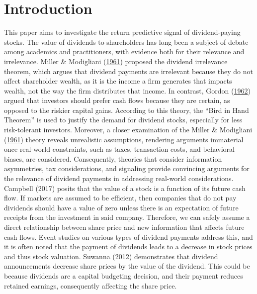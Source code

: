 \documentclass[11pt,preprint, authoryear]{elsarticle}
\numberwithin{equation}{section}
\numberwithin{figure}{section}
\numberwithin{table}{section}
\begin{document}
\setcounter{footnote}{0}



\pagestyle{fancy}
\chead{}
\rhead{}
\lfoot{}
\lhead{}
\cfoot{}


\headsep 35pt %




\hypertarget{introduction}{%
\section*{Introduction}\label{introduction}}

This paper aims to investigate the return predictive signal of
dividend-paying stocks. The value of dividends to shareholders has long
been a subject of debate among academics and practitioners, with
evidence both for their relevance and irrelevance. Miller \& Modigliani
(\protect\hyperlink{ref-miller}{1961}) proposed the dividend irrelevance
theorem, which argues that dividend payments are irrelevant because they
do not affect shareholder wealth, as it is the income a firm generates
that impacts wealth, not the way the firm distributes that income. In
contrast, Gordon (\protect\hyperlink{ref-gordon1962}{1962}) argued that
investors should prefer cash flows because they are certain, as opposed
to the riskier capital gains. According to this theory, the ``Bird in
Hand Theorem'' is used to justify the demand for dividend stocks,
especially for less risk-tolerant investors. Moreover, a closer
examination of the Miller \& Modigliani
(\protect\hyperlink{ref-miller}{1961}) theory reveals unrealistic
assumptions, rendering arguments immaterial once real-world constraints,
such as taxes, transaction costs, and behavioral biases, are considered.
Consequently, theories that consider information asymmetries, tax
considerations, and signaling provide convincing arguments for the
relevance of dividend payments in addressing real-world considerations.
Campbell (2017) posits that the value of a stock is a function of its
future cash flow. If markets are assumed to be efficient, then companies
that do not pay dividends should have a value of zero unless there is an
expectation of future receipts from the investment in said company.
Therefore, we can safely assume a direct relationship between share
price and new information that affects future cash flows. Event studies
on various types of dividend payments address this, and it is often
noted that the payment of dividends leads to a decrease in stock prices
and thus stock valuation. Suwanna (2012) demonstrates that dividend
announcements decrease share prices by the value of the dividend. This
could be because dividends are a capital budgeting decision, and their
payment reduces retained earnings, consequently affecting the share
price.
\end{document}
